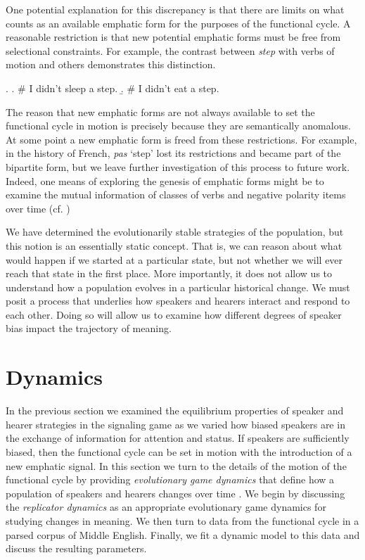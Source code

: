 \documentclass[linguex]{sp}
\theoremstyle{definition} \newtheorem{definition}{Definition}
\begin{document}
One potential explanation for this discrepancy is that there are limits on what counts as an available emphatic form for the purposes of the functional cycle. A reasonable restriction is that  new potential emphatic forms must be free from selectional constraints. For example, the contrast between \emph{step} with verbs of motion and others demonstrates this distinction.

\ex. \a. \# I didn't sleep a step.
       \b. \# I didn't eat a step.


The reason that new emphatic forms are not always available to set the functional cycle in motion is precisely because they are semantically anomalous.   At some point a new emphatic form is freed from these restrictions. For example, in the history of French, \emph{pas} `step' lost its restrictions and became part of the bipartite form, but we leave further investigation of this process to future work. Indeed, one means of exploring the genesis of emphatic forms might be to examine the mutual information of classes of verbs and negative polarity items over time (cf. \citealt{Danescu-Niculescu-Mizil2010})

We have determined the evolutionarily stable strategies of the population, but this notion is an essentially static concept. That is, we can reason about what would happen if we started at a particular state, but not whether we will ever reach that state in the first place. More importantly, it does not allow us to understand how a population evolves in a particular historical change. We must posit a process that underlies how speakers and hearers interact and respond to each other. Doing so will allow us to examine how different degrees of speaker bias impact the trajectory of meaning. 



\section{Dynamics}
\label{Dynamics}

In the previous section we examined the equilibrium properties of speaker and hearer strategies in the signaling game as we varied how biased speakers are in the exchange of information for attention and status. If speakers are sufficiently biased, then the functional cycle can be set in motion with the introduction of a new emphatic signal. In this section we turn to the details of the motion of the functional cycle by providing \emph{evolutionary game dynamics} that define how a population of speakers and hearers changes over time \citep{hofbauer-sigmund1998}. We begin by discussing the \emph{replicator dynamics} \citep{taylor-jonker:1978} as an appropriate evolutionary game dynamics for studying changes in meaning. We then turn to data from the functional cycle in a parsed corpus of Middle English. Finally, we fit a dynamic model to this data and discuss the resulting parameters.
\end{document}
